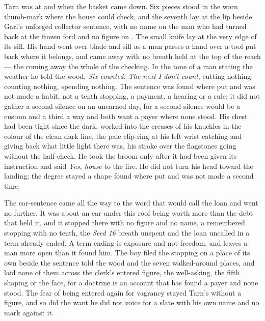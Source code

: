 Tarn was at  and  when the basket came down. Six pieces stood in the worn thumb-mark where the house could check, and the seventh lay at the lip beside Garl's unforged collector sentence, with no name on the man who had turned back at the frozen ford and no figure on . The small knife lay at the very edge of its sill. His hand went over blade and sill as a man passes a hand over a tool put back where it belongs, and came away with no breath held at the top of the reach --- the coming away the whole of the checking. In the tone of a man stating the weather he told the wood, \emph{Six counted. The next I don't count}, cutting nothing, counting nothing, spending nothing. The sentence was found where put and was not made a habit, not a tenth stopping, a payment, a hearing or a rule; it did not gather a second silence on an unearned day, for a second silence would be a custom and a third a way and both want a payer where none stood. His chest had been tight since the dark,  worked into the creases of his knuckles in the colour of the clean dark line, the pale clip-ring at his left wrist catching and giving back what little light there was, his stroke over the flagstones going without the half-check. He took the broom only after it had been given its instruction and said \emph{Yes, house} to the fire. He did not turn his head toward the landing; the degree stayed a shape found where put and was not made a second time.

The ear-sentence came all the way to the word that would call the loan and went no further. It was about an ear under this roof being worth more than the debt that held it, and it stopped there with no figure and no name, a remembered stopping with no tenth, the \emph{Seed 16} breath unspent and the loan uncalled in a term already ended. A term ending is exposure and not freedom, and leaves a man more open than it found him. The boy filed the stopping on a place of its own beside the sentence told the wood and the seven walked-around places, and laid none of them across the clerk's entered figure, the well-asking, the fifth shaping or the face, for a doctrine is an account that has found a payer and none stood. The fear of being entered again for vagrancy stayed Tarn's without a figure, and so did the want he did not voice for a slate with his own name and no mark against it.

